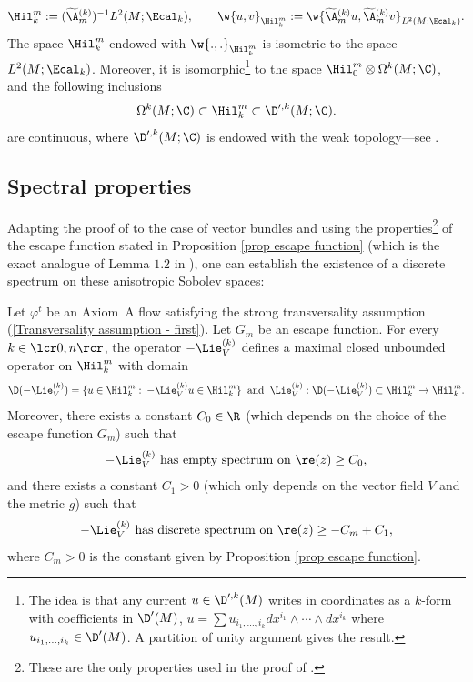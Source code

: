 \[
\Hil_k^{m}:= (\widetilde{\A}{}_m^{(k)})^{-1} L^2 (M; \Ecal_k), \qquad \w{u,v}_{\Hil_k^m}:= \w{\widetilde{\A}{}_m^{(k)} u, \widetilde{\A}{}_m^{(k)} v}_{L^2 (M;\Ecal_k)}.
\]
The space $\Hil_k^m$ endowed with $\w{.,.}_{\Hil_k^m}$ is isometric to the space $L^2 (M; \Ecal_k)$. Moreover, it is isomorphic\footnote{The idea is that any current $u \in \D'^{,k}(M)$ writes in coordinates as a $k$-form with coefficients in $\D'(M)$, \ie $u = \sum u_{i_1,\dots, i_k} dx^{i_1} \wedge \cdots \wedge dx^{i_k}$ where $u_{i_1,\dots, i_k} \in \D' (M)$. A partition of unity argument gives the result.} to the space $\Hil_0^m \otimes \Omega^k (M; \C)$, and the following inclusions
\[
\Omega^k (M; \C) \subset \Hil_k^m \subset \D'^{,k} (M ;\C).
\]
are continuous, where $\D'^{,k} (M; \C)$ is endowed with the weak topology---see \cite{schwartz}.

\subsection{Spectral properties}

Adapting the proof of \cite[Th.\,1.4]{FS} to the case of vector bundles and using the properties\footnote{These are the only properties used in the proof of \cite{FS}.} of the escape function stated in Proposition \ref{prop escape function} (which is the exact analogue of Lemma $1.2$ in \cite{FS}), one can establish the existence of a discrete spectrum on these anisotropic Sobolev spaces:

\begin{thm}\label{thm: discrete sprectrum} Let $\varphi^t$ be an Axiom~A flow satisfying the strong transversality assumption (\ref{Transversality assumption - first}). Let $G_m$ be an escape function. For every $k\in\lcr0,n\rcr$, the operator $-\Lie_V^{(k)}$ defines a maximal closed unbounded operator on $\Hil_k^m$ with domain
\[
\D (-\Lie_V^{(k)}) = \{u \in \Hil_k^m: \: -\Lie_V^{(k)} u \in \Hil_k^m \} \: \text{ and } \: \Lie_V^{(k)}: \D (-\Lie_V^{(k)}) \subset \Hil_k^m \to \Hil_k^m.
\]
Moreover, there exists a constant $C_0 \in \R$ (which depends on the choice of the escape function $G_m$) such that
\[
-\Lie_V^{(k)} \text{ has empty spectrum on } \re (z) \geq C_0,
\]
and there exists a constant $C_1 > 0$ (which only depends on the vector field $V$ and the metric $g$) such that
\[
-\Lie_V^{(k)} \text{ has discrete spectrum on } \re (z) \geq -C_m + C_1,
\]
where $C_m>0$ is the constant given by Proposition \ref{prop escape function}.
\end{thm}

